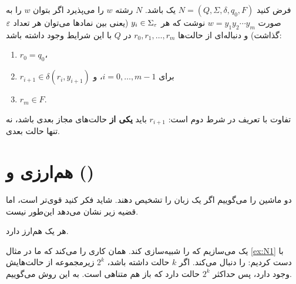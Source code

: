 \begin{definition}
فرض کنید $N=(Q,\Sigma,\delta,q_0,F)$ یک  باشد. $N$ رشته $w$ را می‌پذیرد اگر بتوان $w$ را به صورت $w=y_1y_2\cdots y_m$ نوشت که هر $y_i\in\Sigma_\varepsilon$ (یعنی بین نمادها می‌توان هر تعداد $\varepsilon$ گذاشت) و دنباله‌ای از حالت‌ها $r_0,r_1,\dots,r_m$ در $Q$ با این شرایط وجود داشته باشد:
\begin{enumerate}
\item $r_0=q_0$،
\item $r_{i+1}\in\delta(r_i,y_{i+1})$ برای $i=0,\dots,m-1$، و
\item $r_m\in F$.
\end{enumerate}
\end{definition}

تفاوت با تعریف  در شرط دوم است: $r_{i+1}$ باید \textbf{یکی از} حالت‌های مجاز بعدی باشد، نه تنها حالت بعدی.

\section{هم‌ارزی  و  ()}

دو ماشین را  می‌گوییم اگر یک زبان را تشخیص دهند. شاید فکر کنید  قوی‌تر است، اما قضیه زیر نشان می‌دهد این‌طور نیست.

\begin{theorem}\label{thm:nfa-dfa}
هر  یک  هم‌ارز دارد.
\end{theorem}

\begin{proofidea}
یک  می‌سازیم که  را شبیه‌سازی کند.  همان کاری را می‌کند که ما در مثال \ref{ex:N1} با دست کردیم:  را دنبال می‌کند. اگر  $k$ حالت داشته باشد، $2^k$ زیرمجموعه از حالت‌هایش وجود دارد، پس  حداکثر $2^k$ حالت دارد که باز هم متناهی است. به این روش  می‌گوییم.
\end{proofidea}

